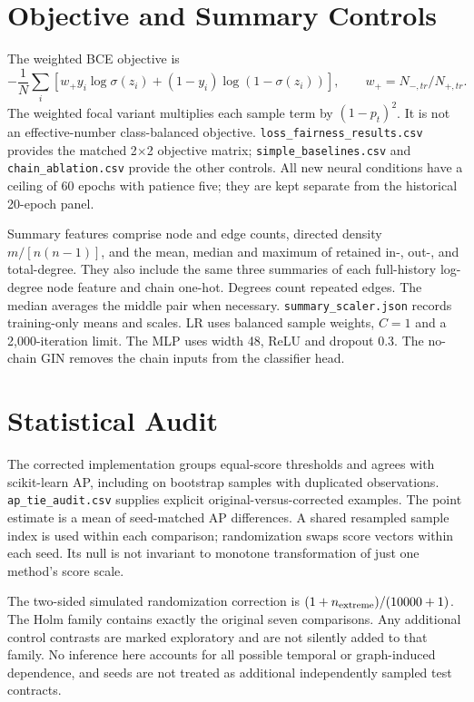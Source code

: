 \documentclass[11pt]{article}
\begin{document}
\section{Objective and Summary Controls}

The weighted BCE objective is
\[
 -\frac{1}{N}\sum_i \left[w_+ y_i\log\sigma(z_i)+(1-y_i)\log(1-\sigma(z_i))\right],
 \qquad w_+=N_{-,tr}/N_{+,tr}.
\]
The weighted focal variant multiplies each sample term by $(1-p_t)^2$. It is not an effective-number class-balanced objective. \texttt{loss\_fairness\_results.csv} provides the matched 2$\times$2 objective matrix; \texttt{simple\_baselines.csv} and \texttt{chain\_ablation.csv} provide the other controls. All new neural conditions have a ceiling of 60 epochs with patience five; they are kept separate from the historical 20-epoch panel.

Summary features comprise node and edge counts, directed density $m/[n(n-1)]$, and the mean, median and maximum of retained in-, out-, and total-degree. They also include the same three summaries of each full-history log-degree node feature and chain one-hot. Degrees count repeated edges. The median averages the middle pair when necessary. \texttt{summary\_scaler.json} records training-only means and scales. LR uses balanced sample weights, $C=1$ and a 2,000-iteration limit. The MLP uses width 48, ReLU and dropout 0.3. The no-chain GIN removes the chain inputs from the classifier head.

\section{Statistical Audit}

The corrected implementation groups equal-score thresholds and agrees with scikit-learn AP, including on bootstrap samples with duplicated observations. \texttt{ap\_tie\_audit.csv} supplies explicit original-versus-corrected examples. The point estimate is a mean of seed-matched AP differences. A shared resampled sample index is used within each comparison; randomization swaps score vectors within each seed. Its null is not invariant to monotone transformation of just one method's score scale.

The two-sided simulated randomization correction is $(1+n_{\rm extreme})/(10000+1)$. The Holm family contains exactly the original seven comparisons. Any additional control contrasts are marked exploratory and are not silently added to that family. No inference here accounts for all possible temporal or graph-induced dependence, and seeds are not treated as additional independently sampled test contracts.

\end{document}
